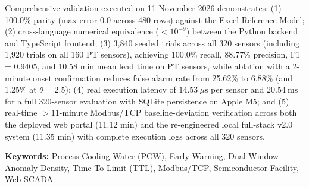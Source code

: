 \documentclass[fontset=none, a4paper, 12pt]{ctexart}
\begin{document}
Comprehensive validation executed on 11 November 2026 demonstrates: (1) 100.0\% parity (max error 0.0 across 480 rows) against the Excel Reference Model; (2) cross-language numerical equivalence ($< 10^{-9}$) between the Python backend and TypeScript frontend; (3) 3,840 seeded trials across all 320 sensors (including 1,920 trials on all 160 PT sensors), achieving 100.0\% recall, 88.77\% precision, F1 = 0.9405, and 10.58 min mean lead time on PT sensors, while ablation with a 2-minute onset confirmation reduces false alarm rate from 25.62\% to 6.88\% (and 1.25\% at $\theta=2.5$); (4) real execution latency of $14.53\ \mu\mathrm{s}$ per sensor and $20.54\ \mathrm{ms}$ for a full 320-sensor evaluation with SQLite persistence on Apple M5; and (5) real-time $>11$-minute Modbus/TCP baseline-deviation verification across both the deployed web portal (11.12 min) and the re-engineered local full-stack v2.0 system (11.35 min) with complete execution logs across all 320 sensors.

\vspace{0.3em}
\noindent \textbf{Keywords:} Process Cooling Water (PCW), Early Warning, Dual-Window Anomaly Density, Time-To-Limit (TTL), Modbus/TCP, Semiconductor Facility, Web SCADA

\newpage

{}
\tableofcontents
\newpage

{}
\listoftables
\newpage

{}
\listoffigures
\newpage
\end{document}
